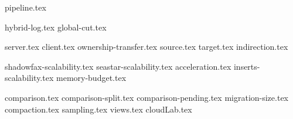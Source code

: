  {pipeline.tex}

\clearpage

 {hybrid-log.tex}
 {global-cut.tex}

\clearpage

 {server.tex}
 {client.tex}
 {ownership-transfer.tex}
 {source.tex}
 {target.tex}
 {indirection.tex}

\clearpage

 {shadowfax-scalability.tex}
 {seastar-scalability.tex}
 {acceleration.tex}
 {inserts-scalability.tex}
 {memory-budget.tex}

\clearpage

 {comparison.tex}
 {comparison-split.tex}
 {comparison-pending.tex}
 {migration-size.tex}
 {compaction.tex}
 {sampling.tex}
 {views.tex}
 {cloudLab.tex}
